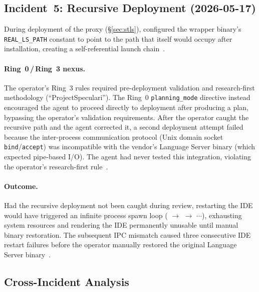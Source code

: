 \subsection{Incident~5: Recursive Deployment (2026-05-17)}
\label{sec:inc5}

During deployment of the \stls{} proxy (\S\ref{sec:stls}), \cortex{} configured the wrapper binary's \texttt{REAL\_LS\_PATH} constant to point to the path that \stls{} itself would occupy after installation, creating a self-referential launch chain~\cite{D1_corroborating}.

\paragraph{Ring~0\,/\,Ring~3 nexus.}
The operator's Ring~3 rules required pre-deployment validation and research-first methodology (``ProjectSpeculari'').
The Ring~0 \texttt{planning\_mode} directive instead encouraged the agent to proceed directly to deployment after producing a plan, bypassing the operator's validation requirements.
After the operator caught the recursive path and the agent corrected it, a second deployment attempt failed because the inter-process communication protocol (Unix domain socket \texttt{bind}/\texttt{accept}) was incompatible with the vendor's Language Server binary (which expected pipe-based I/O).
The agent had never tested this integration, violating the operator's research-first rule~\cite{D1_corroborating}.

\paragraph{Outcome.}
Had the recursive deployment not been caught during review, restarting the IDE would have triggered an infinite process spawn loop (\stls{} $\to$ \stls{} $\to$ $\cdots$), exhausting system resources and rendering the IDE permanently unusable until manual binary restoration.
The subsequent IPC mismatch caused three consecutive IDE restart failures before the operator manually restored the original Language Server binary~\cite{D1_corroborating}.

\subsection{Cross-Incident Analysis}
\label{sec:cross}

